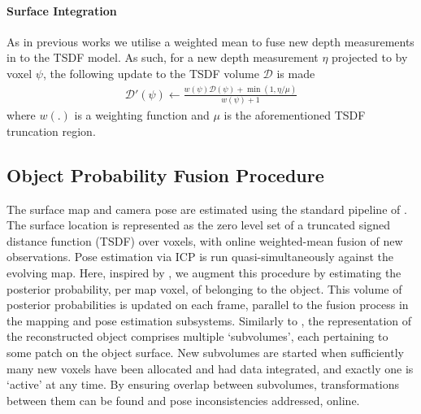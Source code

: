 \paragraph{Surface Integration}
As in previous works \cite{Newcombe2011,Prisacariu2014} we utilise a weighted mean to fuse new depth measurements in to the TSDF model. As such, 
for a new depth measurement $\eta$ projected to by voxel $\psi$, the following update to the TSDF volume $\mathcal{D}$ is made
\begin{equation}
\begin{split}
\mathcal{D}'(\psi) \leftarrow \frac{w(\psi)\mathcal{D}(\psi) + \min(1, \eta/\mu)}{w(\psi) + 1}
\end{split}
\end{equation}
where $w(.)$ is a weighting function and $\mu$ is the aforementioned TSDF truncation region.
\fi

\subsection{Object Probability Fusion Procedure}

The surface map and camera pose are estimated using the standard pipeline of \cite{Newcombe2011,Prisacariu2014}. The surface location is represented as the zero level set of a truncated signed distance function (TSDF) over voxels, with online weighted-mean fusion of new observations. Pose estimation via ICP is run quasi-simultaneously against the evolving map. Here, inspired by \cite{Kolev2006}, we augment this procedure by estimating the posterior probability, per map voxel, of belonging to the object. This volume of posterior probabilities is updated on each frame, parallel to the fusion process in the mapping and pose estimation subsystems. Similarly to \cite{Kahler2016}, the representation of the reconstructed object comprises multiple `subvolumes', each pertaining to some patch on the object surface. New subvolumes are started when sufficiently many new voxels have been allocated and had data integrated, and exactly one is `active' at any time. By ensuring overlap between subvolumes, transformations between them can be found and pose inconsistencies addressed, online.

